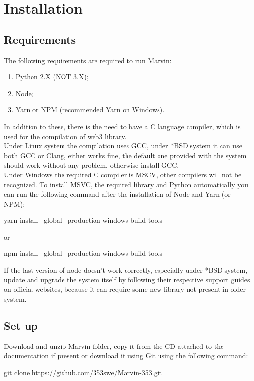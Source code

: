 \documentclass[ManualeSviluppatore]{subfiles}
\begin{document}
\chapter{Installation}
\section{Requirements}
The following requirements are required to run Marvin:
\begin{enumerate}
	\item Python 2.X (NOT 3.X);
	\item Node;
	\item Yarn or NPM (recommended Yarn on Windows).
\end{enumerate}
In addition to these, there is the need to have a C language compiler, which is used for the compilation of web3 library.\\

Under Linux system the compilation uses GCC, under *BSD system it can use both GCC or Clang, 	
either works fine, the default one provided with the system should work without any problem, otherwise install GCC. \\

Under Windows the required C compiler is MSCV, other compilers will not be recognized. To install MSVC, the required library and Python automatically you can run the following command after the installation of Node and Yarn (or NPM): \\
\begin{ttfamily}
yarn install --global --production windows-build-tools \\
\end{ttfamily}
or \\
\begin{ttfamily}
npm install --global --production windows-build-tools \\
\end{ttfamily}

If the last version of node doesn't work correctly, especially under *BSD system, update and upgrade the system itself by following their respective support guides on official websites, because it can require some new library not present in older system.

\section{Set up}
Download and unzip Marvin folder, copy it from the CD attached to the documentation if present or download it using Git using the following command: \\
\begin{ttfamily}
	git clone https://github.com/353swe/Marvin-353.git \\
\end{ttfamily}
\end{document}
